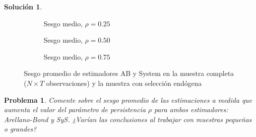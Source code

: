 \documentclass[12pt,letterpaper,reqno,oneside]{amsart}
\theoremstyle{problemstyle} %
\newtheorem{problem}{Problema}
\theoremstyle{definition} %
\newtheorem{solution}{Solución}[problem]
\renewcommand{\thesolution}{\theproblem~(\alph{solution})}
\begin{document}
\begin{solution}
  \begin{figure}[htbp]
    \centering
    \begin{subfigure}[b]{0.49\textwidth}
      \centering
      \resizebox{\textwidth}{!}{}
      \caption{Sesgo medio, $\rho = 0.25$}
      \label{fig:panel1}
    \end{subfigure}
    \hfill
    \begin{subfigure}[b]{0.49\textwidth}
      \centering
      \resizebox{\textwidth}{!}{}
      \caption{Sesgo medio, $\rho = 0.50$}
      \label{fig:panel2}
    \end{subfigure}
    \vfill
    \begin{subfigure}[b]{0.5\textwidth}
      \centering
      \resizebox{\textwidth}{!}{}
      \caption{Sesgo medio, $\rho = 0.75$}
      \label{fig:panel3}
    \end{subfigure}
    \caption{Sesgo promedio de estimadores AB y System en la muestra completa ($N\times T$ observaciones) y la muestra con selección endógena}
    \label{fig:fig1}
  \end{figure}

\end{solution}
\endgroup
\begin{mdframed}
  \begin{problem}
  \label{prob:3}
  Comente sobre el sesgo promedio de las estimaciones a medida que aumenta el valor del parámetro de persistencia $\rho$ para ambos estimadores: Arellano-Bond y SyS. ¿Varían las conclusiones al trabajar con muestras pequeñas o grandes?
  \end{problem}
\end{mdframed}
\begingroup
\renewcommand{\thesolution}{\theproblem}
\end{document}
